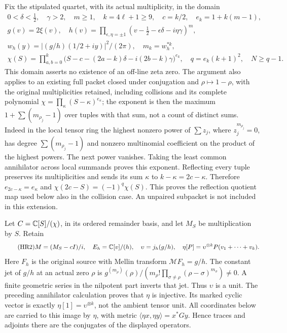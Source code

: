 Fix the stipulated quartet, with its actual multiplicity, in the domain
\begin{equation}\tag{HR1}\label{hrv:HR1}
\begin{gathered}
0<\delta<\tfrac12,\quad\gamma>2,\quad m\ge1,\quad
k=4\ell+1\ge9,\quad c=k/2,\quad e_k=1+k(m-1),\\
g(v)=2\xi(v),\quad h(v)=\prod_{\epsilon,\eta=\pm1}
(v-\tfrac12-\epsilon\delta-i\eta\gamma)^m,\\
w_h(y)=|(g/h)(1/2+iy)|^2/(2\pi),\quad m_k=w_h^{*k},\\
\chi(S)=\prod_{a,b=0}^k
\bigl(S-c-(2a-k)\delta-i(2b-k)\gamma\bigr)^{e_k},\quad
q=e_k(k+1)^2,\quad N\ge q-1.
\end{gathered}
\end{equation}
This domain asserts no existence of an off-line zeta zero. The argument
also applies to an existing full packet closed under conjugation and
\(\rho\mapsto1-\rho\), with the original multiplicities retained,
including collisions and its complete polynomial
\(\chi=\prod_\kappa(S-\kappa)^{e_\kappa}\); the exponent is then the
maximum \(1+\sum(m_{\rho_j}-1)\) over tuples with that sum, not a count
of distinct sums. Indeed in the local tensor ring the highest nonzero
power of \(\sum z_j\), where \(z_j^{m_{\rho_j}}=0\), has degree
\(\sum(m_{\rho_j}-1)\) and nonzero multinomial coefficient on the
product of the highest powers. The next power vanishes. Taking the
least common annihilator across local summands proves this exponent.
Reflecting every tuple preserves its multiplicities and sends its sum
\(\kappa\) to \(k-\kappa=2c-\kappa\). Therefore
\(e_{2c-\kappa}=e_\kappa\) and
\(\chi(2c-S)=(-1)^q\chi(S)\). This proves the reflection quotient
map used below also in the collision case. An unpaired subpacket is
not included in this extension.

Let \(C=\mathbb C[S]/(\chi)\), in its ordered remainder basis, and let
\(M_S\) be multiplication by \(S\). Retain
\begin{equation}\tag{HR2}\label{hrv:HR2}
M=(M_S-cI)/i,\quad E_h=\mathbb C[v]/(h),\quad
\upsilon=j_h(g/h),\quad
\eta[P]=\upsilon^{\otimes k}P(v_1+\cdots+v_k).
\end{equation}
Here \(F_h\) is the original source with Mellin transform
\(\mathcal M F_h=g/h\). The constant jet of \(g/h\) at an actual zero \(\rho\) is
\(g^{(m_\rho)}(\rho)/(m_\rho!\prod_{\sigma\ne\rho}
(\rho-\sigma)^{m_\sigma})\ne0\). A finite geometric series in the
nilpotent part inverts that jet. Thus \(\upsilon\) is a unit.
The preceding annihilator calculation proves that \(\eta\) is
injective. Its marked cyclic vector is exactly
\(\eta[1]=\upsilon^{\otimes k}\), not the ambient tensor unit.
All coordinates below are carried to this image by \(\eta\), with
metric \(\langle\eta x,\eta y\rangle=x^*Gy\). Hence traces and
adjoints there are the conjugates of the displayed operators.

